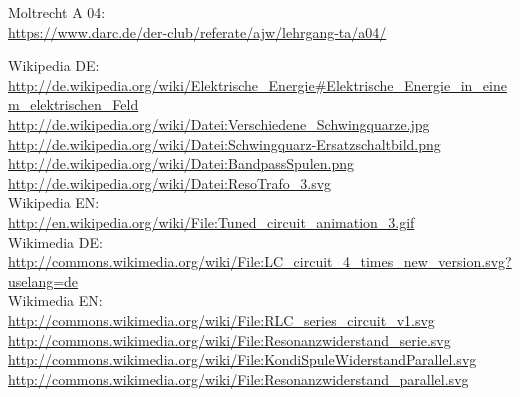 \begin{thebibliography}{}
     Moltrecht A 04: \\
    \url{https://www.darc.de/der-club/referate/ajw/lehrgang-ta/a04/}

      Wikipedia DE: \\
    \url{http://de.wikipedia.org/wiki/Elektrische_Energie#Elektrische_Energie_in_einem_elektrischen_Feld}\\
    \url{http://de.wikipedia.org/wiki/Datei:Verschiedene_Schwingquarze.jpg}\\
    \url{http://de.wikipedia.org/wiki/Datei:Schwingquarz-Ersatzschaltbild.png}\\
    \url{http://de.wikipedia.org/wiki/Datei:BandpassSpulen.png}\\
    \url{http://de.wikipedia.org/wiki/Datei:ResoTrafo_3.svg}\\

   Wikipedia EN:\\
    \url{http://en.wikipedia.org/wiki/File:Tuned_circuit_animation_3.gif}\\

   Wikimedia DE:\\
    \url{http://commons.wikimedia.org/wiki/File:LC_circuit_4_times_new_version.svg?uselang=de}\\
    \vspace{1cm}
   Wikimedia EN:\\
    \url{http://commons.wikimedia.org/wiki/File:RLC_series_circuit_v1.svg}\\
    \url{http://commons.wikimedia.org/wiki/File:Resonanzwiderstand_serie.svg}\\
    \url{http://commons.wikimedia.org/wiki/File:KondiSpuleWiderstandParallel.svg}\\
    \url{http://commons.wikimedia.org/wiki/File:Resonanzwiderstand_parallel.svg}\\

\end{thebibliography}


